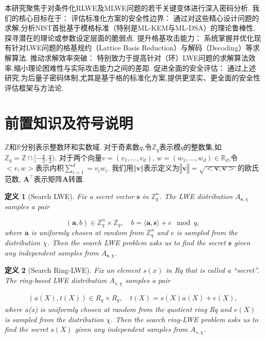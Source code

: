 \documentclass[12pt,a4paper]{article}
\newtheorem{definition}{定义} %
\numberwithin{equation}{section}
\begin{document}
本研究聚焦于对条件化RLWE及MLWE问题的若干关键变体进行深入密码分析. 我们的核心目标在于：
评估标准化方案的安全性边界： 通过对这些精心设计问题的求解,分析NIST首批基于模格标准（特别是ML-KEM与ML-DSA）的理论鲁棒性,探寻潜在的理论或参数设定层面的脆弱点.
提升格基攻击能力： 系统掌握并优化现有针对LWE问题的格基规约（Lattice Basis Reduction）与解码（Decoding）等求解算法.
推动求解效率突破： 特别致力于提高针对（环）LWE问题的求解算法效率,缩小理论困难性与实际攻击能力之间的差距.
促进全面的安全评估： 通过上述研究,为后量子密码体制,尤其是基于格的标准化方案,提供更坚实、更全面的安全性评估框架与方法论.






\section{前置知识及符号说明}
$\mathbb{Z}$和$\mathbb{R}$分别表示整数环和实数域.
对于奇素数$q$,令$\mathbb{Z}_q$表示模$q$的整数集,如$\mathbb{Z}_q = \mathbb{Z}\cap[-\frac{q}{2},\frac{q}{2})$.
对于两个向量$v =(v_1 , \ldots , v_d)$, $w = ( w_1 , \ldots , w_d) \in \mathbb{R}_d$,令$<v,w>$表示内积$ \sum_{i=1}^{d}= v_iw_i$.
我们用$‖\mathbf{v}‖$表示定义为$‖\mathbf{v}‖=\sqrt{<\mathbf{v},\mathbf{v}>}$的欧氏范数, $\mathbf{A}^\top$表示矩阵$\mathbf{A}$转置.

\begin{definition}[Search LWE]
Fix a secret vector $\mathbf{s}$ in $\mathbb{Z}_q^n$.  
The LWE distribution $A_{\mathbf{s},\chi}$ samples a pair  

\[
(\mathbf{a}, b) \in \mathbb{Z}_q^n \times \mathbb{Z}_q, \quad b = \langle \mathbf{a}, \mathbf{s} \rangle + e \mod q,
\]  
where $\mathbf{a}$ is uniformly chosen at random from $\mathbb{Z}_q^n$ and $e$ is sampled from the distribution $\chi$. Then the search LWE problem asks us to find the secret $\mathbf{s}$ given any independent samples from $A_{\mathbf{s},\chi}$.  
\end{definition}

\begin{definition}[Search Ring-LWE]
Fix an element $s(x)$ in Rq that is called a “secret”. 
The ring-based LWE distribution $A_{s,\chi}$ samples a pair

\begin{align*}
    (a(X), t(X)) \in R_q \times R_q, \quad t(X) = s(X)a(X) + e(X),
\end{align*}
where a(x) is uniformly chosen at random from the quotient ring Rq and $e(X)$ is sampled from the distribution $\chi$. Then the search ring-LWE problem asks us to find the secret $s(X)$ given any independent samples from $A_{s,\chi}$.
\end{definition}
\end{document}
